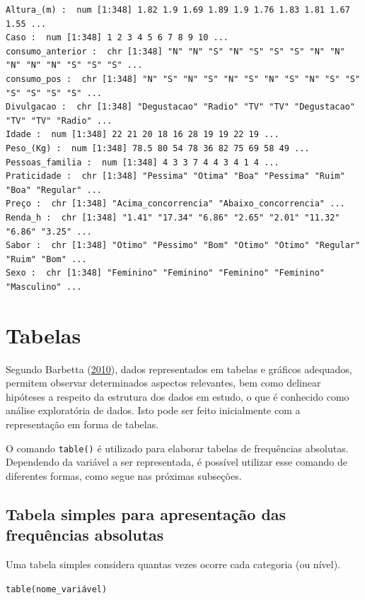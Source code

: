 \documentclass[12pt,brazil,oneside]{book}
\begin{document}
\begin{verbatim}
Altura_(m) :  num [1:348] 1.82 1.9 1.69 1.89 1.9 1.76 1.83 1.81 1.67 1.55 ...
Caso :  num [1:348] 1 2 3 4 5 6 7 8 9 10 ...
consumo_anterior :  chr [1:348] "N" "N" "S" "N" "S" "S" "S" "N" "N" "N" "N" "N" "S" "S" "S" ...
consumo_pos :  chr [1:348] "N" "S" "N" "S" "N" "S" "N" "S" "N" "S" "S" "S" "S" "S" "S" ...
Divulgacao :  chr [1:348] "Degustacao" "Radio" "TV" "TV" "Degustacao" "TV" "TV" "Radio" ...
Idade :  num [1:348] 22 21 20 18 16 28 19 19 22 19 ...
Peso_(Kg) :  num [1:348] 78.5 80 54 78 36 82 75 69 58 49 ...
Pessoas_familia :  num [1:348] 4 3 3 7 4 4 3 4 1 4 ...
Praticidade :  chr [1:348] "Pessima" "Otima" "Boa" "Pessima" "Ruim" "Boa" "Regular" ...
Preço :  chr [1:348] "Acima_concorrencia" "Abaixo_concorrencia" ...
Renda_h :  chr [1:348] "1.41" "17.34" "6.86" "2.65" "2.01" "11.32" "6.86" "3.25" ...
Sabor :  chr [1:348] "Otimo" "Pessimo" "Bom" "Otimo" "Otimo" "Regular" "Ruim" "Bom" ...
Sexo :  chr [1:348] "Feminino" "Feminino" "Feminino" "Feminino" "Masculino" ...
\end{verbatim}

\hypertarget{tabelas}{%
\section{Tabelas}\label{tabelas}}

Segundo Barbetta (\protect\hyperlink{ref-barbetta1988}{2010}), dados representados em tabelas e gráficos adequados, permitem observar determinados aspectos relevantes, bem como delinear hipóteses a respeito da estrutura dos dados em estudo, o que é conhecido como análise exploratória de dados. Isto pode ser feito inicialmente com a representação em forma de tabelas.

O comando \texttt{table()} é utilizado para elaborar tabelas de frequências absolutas. Dependendo da variável a ser representada, é possível utilizar esse comando de diferentes formas, como segue nas próximas subseções.

\hypertarget{tabela-simples-para-apresentacao-das-frequencias-absolutas}{%
\subsection{Tabela simples para apresentação das frequências absolutas}\label{tabela-simples-para-apresentacao-das-frequencias-absolutas}}

Uma tabela simples considera quantas vezes ocorre cada categoria (ou nível).

\texttt{table(nome\_variável)}
\end{document}
